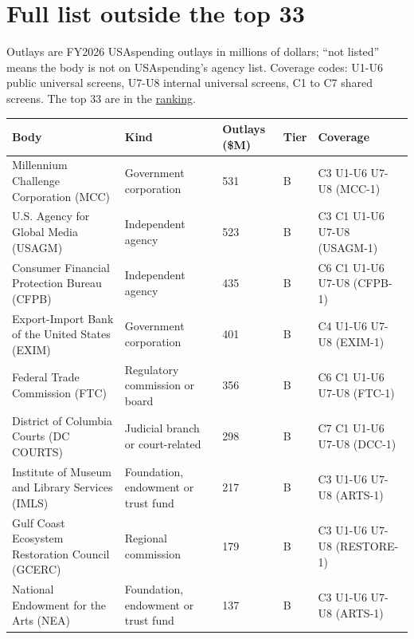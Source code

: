 \documentclass[letterpaper,11pt]{article}
\begin{document}
\hypertarget{full-list-outside-the-top-33}{%
\section{Full list outside the top
33}\label{full-list-outside-the-top-33}}

Outlays are FY2026 USAspending outlays in millions of dollars; ``not
listed'' means the body is not on USAspending's agency list. Coverage
codes: U1-U6 public universal screens, U7-U8 internal universal screens,
C1 to C7 shared screens. The top 33 are in the
\href{../agencies/top33.pdf}{ranking}.

\begingroup\small\setlength{\tabcolsep}{4pt}\renewcommand{\arraystretch}{1.25}
\begin{longtable}[l]{@{}>{\raggedright\arraybackslash}p{}>{\raggedright\arraybackslash}p{}ll>{\raggedright\arraybackslash}p{}@{}}
\rowcolor{coolblack}\leavevmode\color{white}\bfseries Body & \leavevmode\color{white}\bfseries Kind & \leavevmode\color{white}\bfseries \makecell[tl]{Outlays\\(\$M)} & \leavevmode\color{white}\bfseries Tier & \leavevmode\color{white}\bfseries Coverage \\
\endhead
Millennium Challenge Corporation (MCC) & Government corporation & 531 & B & C3 U1-U6 U7-U8 (MCC-1) \\
U.S. Agency for Global Media (USAGM) & Independent agency & 523 & B & C3 C1 U1-U6 U7-U8 (USAGM-1) \\
Consumer Financial Protection Bureau (CFPB) & Independent agency & 435 & B & C6 C1 U1-U6 U7-U8 (CFPB-1) \\
Export-Import Bank of the United States (EXIM) & Government corporation & 401 & B & C4 U1-U6 U7-U8 (EXIM-1) \\
Federal Trade Commission (FTC) & Regulatory commission or board & 356 & B & C6 C1 U1-U6 U7-U8 (FTC-1) \\
District of Columbia Courts (DC COURTS) & Judicial branch or court-related & 298 & B & C7 C1 U1-U6 U7-U8 (DCC-1) \\
Institute of Museum and Library Services (IMLS) & Foundation, endowment or trust fund & 217 & B & C3 U1-U6 U7-U8 (ARTS-1) \\
Gulf Coast Ecosystem Restoration Council (GCERC) & Regional commission & 179 & B & C3 U1-U6 U7-U8 (RESTORE-1) \\
National Endowment for the Arts (NEA) & Foundation, endowment or trust fund & 137 & B & C3 U1-U6 U7-U8 (ARTS-1) \\

\end{longtable}
\end{document}
